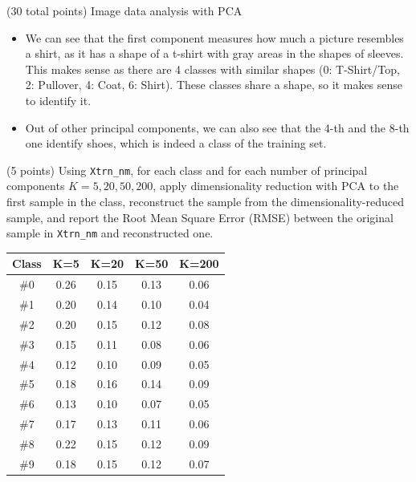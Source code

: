 \documentclass[12pt]{article}
\begin{document}
\begin{question}{(30 total points) Image data analysis with PCA}
\begin{subquestion}
\begin{answerbox}{35em}
	\begin{itemize}
	\itemsep -3pt {}
	\item We can see that the first component measures how much a picture resembles a shirt, as it has a shape of a t-shirt with gray areas in the shapes of sleeves. This makes sense as there are 4 classes with similar shapes (0: T-Shirt/Top, 2: Pullover, 4: Coat, 6: Shirt). These classes share a shape, so it makes sense to identify it. 
	\item Out of other principal components, we can also see that the 4-th and the 8-th one identify shoes, which is indeed a class of the training set.
	\end{itemize}
      \end{answerbox}
  


   \end{subquestion}

   \begin{subquestion}{(5 points)
       Using \texttt{Xtrn\_nm}, 
       for each class and for each number of principal components $K =
       5, 20, 50, 200$, apply dimensionality reduction with PCA to the
       first sample in the class, reconstruct the sample from the
       dimensionality-reduced sample, and 
       report the Root Mean Square Error (RMSE) between the
       original sample in {\tt Xtrn\_nm} and reconstructed one.
     } \label{Q1.6}

     

      \begin{answerbox}{25em}
      \begin{center}
         \begin{tabular}{|c|c|c|c|c|}
         \hline 
        Class & K=5 & K=20 & K=50 & K=200 \\ \hline
	    \#0 & 0.26 & 0.15 & 0.13 & 0.06\\
		\#1 & 0.20 & 0.14 & 0.10 & 0.04\\
		\#2 & 0.20 & 0.15 & 0.12 & 0.08\\
		\#3 & 0.15 & 0.11 & 0.08 & 0.06\\
		\#4 & 0.12 & 0.10 & 0.09 & 0.05\\
		\#5 & 0.18 & 0.16 & 0.14 & 0.09\\
		\#6 & 0.13 & 0.10 & 0.07 & 0.05\\
		\#7 & 0.17 & 0.13 & 0.11 & 0.06\\
		\#8 & 0.22 & 0.15 & 0.12 & 0.09\\
		\#9 & 0.18 & 0.15 & 0.12 & 0.07\\
		\hline
         \end{tabular} 
         \end{center}
      \end{answerbox}
  



\end{subquestion}
\end{question}
\end{document}
